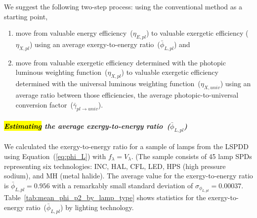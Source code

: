 \documentclass[energies,article,accept,moreauthors,pdftex]{Definitions/mdpi}\usepackage[]{graphicx}\usepackage[]{color}
\newcommand{\gammaratavg}{\bar{\gamma}_{pl\rightarrow{}univ}}
\begin{document}
We suggest the following two-step process:  
using the conventional method as a starting point,
%
\begin{enumerate}

  \item move from valuable energy efficiency~($\eta_{E,pl}$)
        to valuable exergetic efficiency ($\eta_{X,pl}$)
        using an average exergy-to-energy ratio~($\bar{\phi}_{L,pl}$) and 

  \item move from valuable exergetic efficiency determined with the photopic luminous weighting function~($\eta_{X,pl}$)
        to valuable exergetic efficiency determined with the universal luminous weighting function~($\eta_{X,univ}$)
        using an average ratio between those efficiencies,
        the average photopic-to-universal conversion factor~($\gammaratavg{}$).

\end{enumerate}









\paragraph{\emph{\hl{Estimating} the average exergy-to-energy ratio~($\bar{\phi}_{L,pl}$)}} %

We calculated the exergy-to-energy ratio for a sample of lamps from the LSPDD \cite{aube2013}
using Equation~(\ref{eq:phi_L}) with $f_\lambda = V_\lambda$. 
(The sample consists of 45 lamp SPDs representing six technologies: 
INC, HAL, CFL, LED, HPS (high pressure sodium), and MH (metal halide).
The average value for the exergy-to-energy ratio is
$\bar{\phi}_{L,pl} = 0.956$ 
with a remarkably small standard deviation of $\sigma_{\phi_{L,pl}} = 0.00037$. Table~\ref{tab:mean_phi_p2_by_lamp_type} shows 
statistics for the exergy-to-energy ratio~($\bar{\phi}_{L,pl}$)
by lighting technology.
\end{document}
